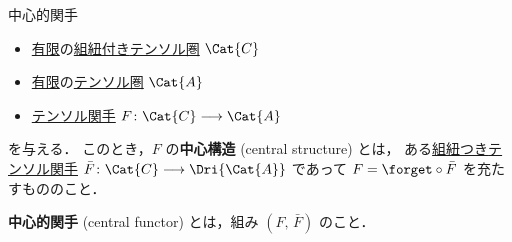 \documentclass[TQFT_main]{subfiles}
\begin{document}
\begin{mydef}[label=def:central-functor,breakable]{中心的関手}
    \begin{itemize}
        \item \hyperref[def:finite-abcat]{有限}の\hyperref[redef:braided-monoidal]{組紐付き}\hyperref[def:tensorfusion-cat]{テンソル圏} $\Cat{C}$ 
        \item \hyperref[def:finite-abcat]{有限}の\hyperref[def:tensorfusion-cat]{テンソル圏} $\Cat{A}$
        \item \hyperref[def:tensor-functor]{テンソル関手} $F \colon \Cat{C} \lto \Cat{A}$
    \end{itemize}
    を与える．
    このとき，$F$ の\textbf{中心構造} (central structure) とは，
    ある\hyperref[def:braided-monoidal-functor]{組紐つき}\hyperref[def:tensor-functor]{テンソル関手} $\bar{F} \colon \Cat{C} \lto \Dri{\Cat{A}}$ であって
    $F = \forget \circ \bar{F}$ を充たすもののこと．
    \begin{center}
    \end{center}
    \textbf{中心的関手} (central functor) とは，組み $(F,\, \bar{F})$ のこと．
    \tcblower


\end{mydef}
\end{document}
